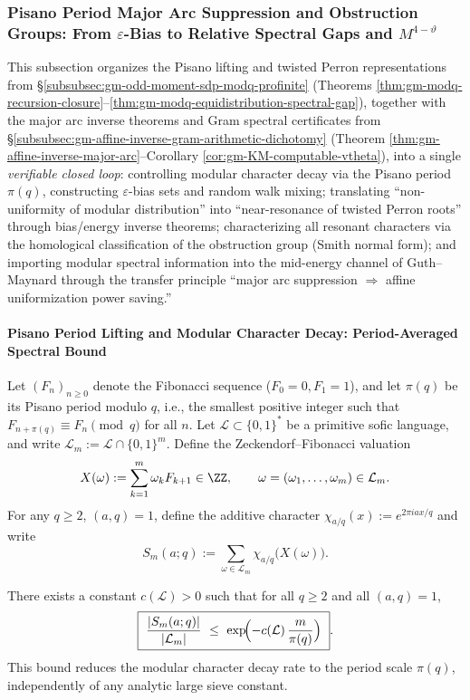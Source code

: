\subsubsection{Pisano Period Major Arc Suppression and Obstruction Groups: From \texorpdfstring{$\varepsilon$}{epsilon}-Bias to Relative Spectral Gaps and \texorpdfstring{$M^{4-\vartheta}$}{M4-vtheta}}\label{subsubsec:gm-pisano-bias-obstruction-majorarc}
This subsection organizes the Pisano lifting and twisted Perron representations from \S\ref{subsubsec:gm-odd-moment-sdp-modq-profinite} (Theorems \ref{thm:gm-modq-recursion-closure}--\ref{thm:gm-modq-equidistribution-spectral-gap}), together with the major arc inverse theorems and Gram spectral certificates from \S\ref{subsubsec:gm-affine-inverse-gram-arithmetic-dichotomy} (Theorem \ref{thm:gm-affine-inverse-major-arc}--Corollary \ref{cor:gm-KM-computable-vtheta}), into a single \emph{verifiable closed loop}: controlling modular character decay via the Pisano period \(\pi(q)\), constructing \(\varepsilon\)-bias sets and random walk mixing; translating ``non-uniformity of modular distribution'' into ``near-resonance of twisted Perron roots'' through bias/energy inverse theorems; characterizing all resonant characters via the homological classification of the obstruction group (Smith normal form); and importing modular spectral information into the mid-energy channel of Guth--Maynard through the transfer principle ``major arc suppression \(\Rightarrow\) affine uniformization power saving.''

\paragraph{Pisano Period Lifting and Modular Character Decay: Period-Averaged Spectral Bound}
Let \((F_n)_{n\ge 0}\) denote the Fibonacci sequence (\(F_0=0,F_1=1\)), and let \(\pi(q)\) be its Pisano period modulo \(q\), i.e., the smallest positive integer such that \(F_{n+\pi(q)}\equiv F_n\pmod q\) for all \(n\).
Let \(\mathcal{L}\subset\{0,1\}^\ast\) be a primitive sofic language, and write \(\mathcal{L}_m:=\mathcal{L}\cap\{0,1\}^m\).
Define the Zeckendorf--Fibonacci valuation
\[
X(\omega):=\sum_{k=1}^{m}\omega_k F_{k+1}\in\ZZ,
\qquad \omega=(\omega_1,\dots,\omega_m)\in\mathcal{L}_m.
\]
For any \(q\ge 2\), \((a,q)=1\), define the additive character \(\chi_{a/q}(x):=e^{2\pi i ax/q}\) and write
\[
S_m(a;q):=\sum_{\omega\in\mathcal{L}_m}\chi_{a/q}\!\bigl(X(\omega)\bigr).
\]

\begin{theorem}\label{thm:gm-pisano-period-character-decay}
There exists a constant \(c(\mathcal{L})>0\) such that for all \(q\ge 2\) and all \((a,q)=1\),
\[
\boxed{\
\frac{|S_m(a;q)|}{|\mathcal{L}_m|}\ \le\ \exp\!\Bigl(-c(\mathcal{L})\,\frac{m}{\pi(q)}\Bigr)\ }.
\]
This bound reduces the modular character decay rate to the period scale \(\pi(q)\), independently of any analytic large sieve constant.
\end{theorem}

